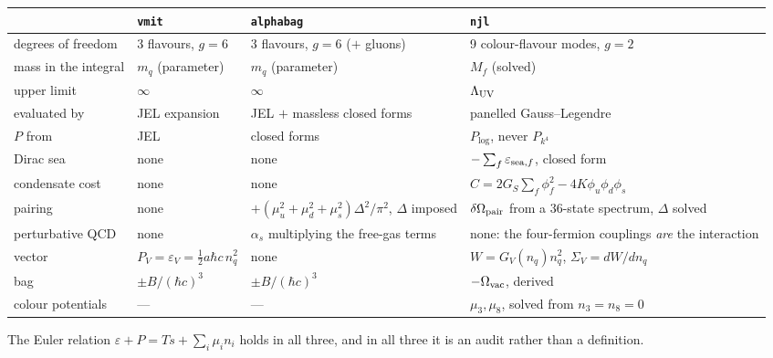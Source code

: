 \documentclass[aps,prc,onecolumn,superscriptaddress,nofootinbib,10pt]{revtex4-2}
\newcommand{\nq}{n_q}
\newcommand{\Lam}{\Lambda}
\newcommand{\GS}{G_S}
\newcommand{\GV}{G_V}
\begin{document}
\begin{center}
\footnotesize
\begin{tabular}{p{}p{}p{}p{}}
\toprule
 & \texttt{vmit} & \texttt{alphabag} & \texttt{njl} \\
\midrule
degrees of freedom & 3 flavours, $g=6$ & 3 flavours, $g=6$ ($+$ gluons)
  & 9 colour-flavour modes, $g=2$ \\
mass in the integral & $m_q$ (parameter) & $m_q$ (parameter) & $M_f$ (solved) \\
upper limit & $\infty$ & $\infty$ & $\Lam_{\rm UV}$ \\
evaluated by & JEL expansion & JEL $+$ massless closed forms
  & panelled Gauss--Legendre \\
$P$ from & JEL & closed forms & $P_{\log}$, never $P_{k^4}$ \\
Dirac sea & none & none & $-\sum_f \varepsilon_{{\rm sea},f}$, closed form \\
condensate cost & none & none
  & $C = 2\GS\sum_f\phi_f^2 - 4K\phi_u\phi_d\phi_s$ \\
pairing & none
  & $+(\mu_u^2+\mu_d^2+\mu_s^2)\Delta^2/\pi^2$, $\Delta$ imposed
  & $\delta\Omega_{\rm pair}$ from a 36-state spectrum, $\Delta$ solved \\
perturbative QCD & none & $\alpha_s$ multiplying the free-gas terms
  & none: the four-fermion couplings \emph{are} the interaction \\
vector & $P_V = \varepsilon_V = \tfrac12 a\hbar c\,\nq^2$ & none
  & $W = \GV(\nq)\nq^2$, $\Sigma_V = dW/d\nq$ \\
bag & $\pm B/(\hbar c)^3$ & $\pm B/(\hbar c)^3$
  & $-\Omega_{\rm vac}$, derived \\
colour potentials & --- & --- & $\mu_3,\mu_8$, solved from $n_3 = n_8 = 0$ \\
\bottomrule
\end{tabular}
\end{center}

The Euler relation $\varepsilon + P = Ts + \sum_i \mu_i n_i$ holds in all
three, and in all three it is an audit rather than a definition.
\end{document}
